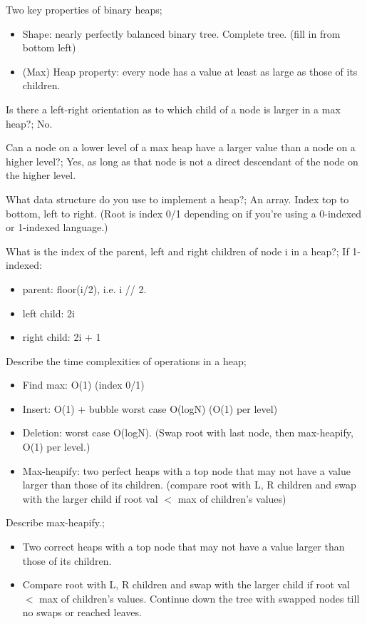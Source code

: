\documentclass{article}
\begin{document}
Two key properties of binary heaps; \begin{itemize}
	\item Shape: nearly perfectly balanced binary tree. Complete tree. (fill in from bottom left)
	\item (Max) Heap property: every node has a value at least as large as those of its children.
\end{itemize}

Is there a left-right orientation as to which child of a node is larger in a max heap?; No.

Can a node on a lower level of a max heap have a larger value than a node on a higher level?; Yes, as long as that node is not a direct descendant of the node on the higher level.

What data structure do you use to implement a heap?; An array. Index top to bottom, left to right. (Root is index 0/1 depending on if you're using a 0-indexed or 1-indexed language.)

What is the index of the parent, left and right children of node i in a heap?; If 1-indexed: \begin{itemize}
	\item parent: floor(i/2), i.e. i // 2.
	\item left child: 2i
	\item right child: 2i + 1
\end{itemize}

Describe the time complexities of operations in a heap; \begin{itemize}
    \item Find max: O(1) (index 0/1)
    \item Insert: O(1) + bubble worst case O(logN) (O(1) per level)
    \item Deletion: worst case O(logN). (Swap root with last node, then max-heapify, O(1) per level.)
    \item Max-heapify: two perfect heaps with a top node that may not have a value larger than those of its children. (compare root with L, R children and swap with the larger child if root val $<$ max of children's values)
\end{itemize}

Describe max-heapify.; \begin{itemize}
    \item Two correct heaps with a top node that may not have a value larger than those of its children. 
    \item Compare root with L, R children and swap with the larger child if root val $<$ max of children's values. Continue down the tree with swapped nodes till no swaps or reached leaves.
\end{itemize}
\end{document}
